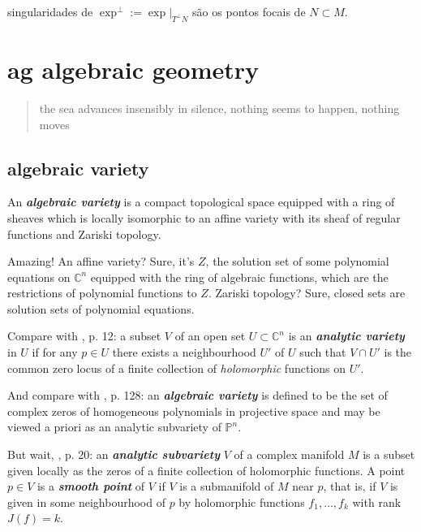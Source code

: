 \begin{prop}\leavevmode
singularidades de \(\operatorname{exp}^\perp:=\operatorname{exp}|_{T^\perp N}\) são os pontos focais de \(N \subset M\).
\end{prop}

\clearpage
\chapter{ag algebraic geometry}

\begin{quotation}
	the sea advances insensibly in silence, nothing seems to happen, nothing moves
\end{quotation}

\section{algebraic variety}

An \textit{\textbf{algebraic variety}} is a compact topological space equipped with a ring of sheaves which is locally isomorphic to an affine variety with its sheaf of regular functions and Zariski topology.

Amazing! An affine variety? Sure, it's \(Z\), the solution set of some polynomial equations on \(\mathbb{C}^n\) equipped with the ring of algebraic functions, which are the restrictions of polynomial functions to \(Z\). Zariski topology? Sure, closed sets are solution sets of polynomial equations.

Compare with \cite{gri}, p. 12: a subset \(V\) of an open set \(U \subset \mathbb{C}^n\) is an \textit{\textbf{analytic variety}} in \(U\) if for any \(p \in U\) there exists a neighbourhood \(U'\) of \(U\) such that \(V \cap U'\) is the common zero locus of a finite collection of \textit{holomorphic} functions on \(U'\).

And compare with \cite{gri}, p. 128: an \textit{\textbf{algebraic variety}} is defined to be the set of complex zeros of homogeneous polynomials in projective space and may be viewed a priori as an analytic subvariety of \(\mathbb{P}^n\).

But wait, \cite{gri}, p. 20: an \textit{\textbf{analytic subvariety}} \(V\) of a complex manifold \(M\) is a subset given locally as the zeros of a finite collection of holomorphic functions. A point \(p \in V\) is a \textit{\textbf{smooth point}} of \(V\) if \(V\) is a submanifold of \(M\) near \(p\), that is, if \(V\) is given in some neighbourhood of \(p\) by holomorphic functions \(f_1,\ldots,f_k\) with rank \(J(f)=k\).

